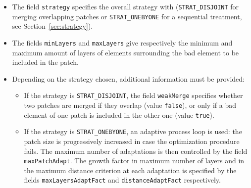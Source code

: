 \documentclass[12pt,a4paper,a4wide]{article}
\begin{document}
\begin{itemize}
\item The field \texttt{strategy} specifies the overall strategy
with (\texttt{STRAT\_DISJOINT} for merging overlapping patches
or \texttt{STRAT\_ONEBYONE} for a sequential treatment, see
Section~\ref{sec:strategy}).
\item The fields \texttt{minLayers} and \texttt{maxLayers} give
respectively the minimum and maximum amount of layers of elements
surrounding the bad element to be included in the patch.
\item Depending on the strategy chosen, additional information
must be provided:
\begin{itemize}
\item If the strategy is \texttt{STRAT\_DISJOINT}, the field
\texttt{weakMerge} specifies whether two patches are merged if
they overlap (value \texttt{false}), or only if a bad element
of one patch is included in the other one (value \texttt{true}).
\item If the strategy is \texttt{STRAT\_ONEBYONE}, an adaptive
process loop is used: the patch size is progressively increased
in case the optimization procedure fails. The maximum number of
adaptations is then controlled by the field \texttt{maxPatchAdapt}.
The growth factor in maximum number of layers and in the maximum
distance criterion at each adaptation is specified by the fields
\texttt{maxLayersAdaptFact} and \texttt{distanceAdaptFact}
respectively.
\end{itemize}
\end{itemize}
\end{document}
